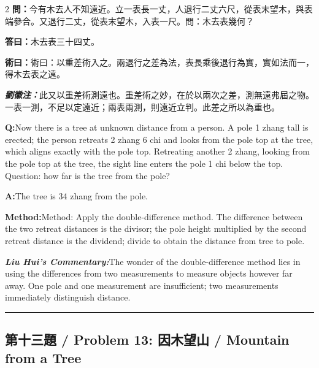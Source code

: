 \documentclass[11pt,a4paper]{article}
\newcommand{\cnwen}{\textcolor{cnlabelfg}{\textbf{問：}}}
\newcommand{\cnda}{\textbf{答曰：}}
\newcommand{\cnshu}{\textcolor{cnlabelfg}{\textbf{術曰：}}}
\newcommand{\cnzhu}{\textcolor{commentarycolor}{\textit{\textbf{劉徽注：}}}}
\newcommand{\enwen}{\textcolor{enlabelfg}{\textbf{Q:}}}
\newcommand{\enda}{\textcolor{enlabelfg}{\textbf{A:}}}
\newcommand{\enshu}{\textcolor{enlabelfg}{\textbf{Method:}}}
\newcommand{\enzhu}{\textcolor{enlabelfg}{\textit{\textbf{Liu Hui's Commentary:}}}}
\begin{document}
\begin{paracol}{2}
\switchcolumn[0]
\cnwen 今有木去人不知遠近。立一表長一丈，人退行二丈六尺，從表末望木，與表端參合。又退行二丈，從表末望木，入表一尺。問：木去表幾何？

\cnda 木去表三十四丈。

\cnshu 術曰：以重差術入之。兩退行之差為法，表長乘後退行為實，實如法而一，得木去表之遠。

\cnzhu 此又以重差術測遠也。重差術之妙，在於以兩次之差，測無遠弗屆之物。一表一測，不足以定遠近；兩表兩測，則遠近立判。此差之所以為重也。

\switchcolumn[1]
\enwen Now there is a tree at unknown distance from a person. A pole 1 zhang tall is erected; the person retreats 2 zhang 6 chi and looks from the pole top at the tree, which aligns exactly with the pole top. Retreating another 2 zhang, looking from the pole top at the tree, the sight line enters the pole 1 chi below the top. Question: how far is the tree from the pole?

\enda The tree is 34 zhang from the pole.

\enshu Method: Apply the double-difference method. The difference between the two retreat distances is the divisor; the pole height multiplied by the second retreat distance is the dividend; divide to obtain the distance from tree to pole.

\enzhu The wonder of the double-difference method lies in using the differences from two measurements to measure objects however far away. One pole and one measurement are insufficient; two measurements immediately distinguish distance.
\end{paracol}

\bigskip\hrule\bigskip

\subsection{第十三題 / Problem 13: 因木望山 / Mountain from a Tree}
\end{document}
